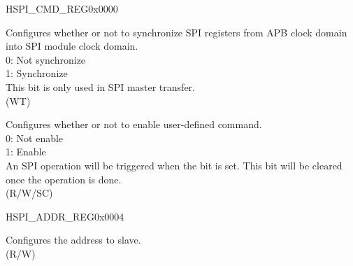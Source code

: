 \begin{register}{H}{SPI\_CMD\_REG}{0x0000}\label{regdesc:SPI3CMDREG}
%
%
%
%
\regnewline%
\begin{regdesc}\begin{reglist}
\label{fielddesc:SPI3UPDATE}\item [SPI\_UPDATE] Configures whether or not to synchronize SPI registers from APB clock domain into SPI module clock domain. \\
0: Not synchronize \\
1: Synchronize \\
This bit is only used in SPI master transfer. \\
(WT)
\label{fielddesc:SPI3USR}\item [SPI\_USR] Configures whether or not to enable user-defined command. \\
0: Not enable \\
1: Enable \\
An SPI operation will be triggered when the bit is set. This bit will be cleared once the operation is done.\\
(R/W/SC)
\end{reglist}\end{regdesc}
\end{register}


\begin{register}{H}{SPI\_ADDR\_REG}{0x0004}\label{regdesc:SPI3ADDRREG}
%
\regnewline%
\begin{regdesc}\begin{reglist}
\label{fielddesc:SPI3USRADDRVALUE}\item [SPI\_USR\_ADDR\_VALUE] Configures the address to slave. \\
(R/W)
\end{reglist}\end{regdesc}
\end{register}


